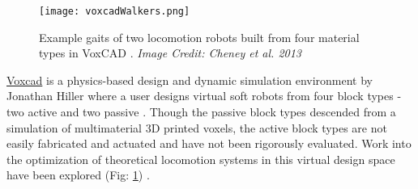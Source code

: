 {\begin{figure}
  \texttt{[image: voxcadWalkers.png]}
  \caption{Example gaits of two locomotion robots built from four material types in VoxCAD \cite{Cheney2013b}.  \textit{Image Credit: Cheney et al. 2013}}
  \label{fig:voxcadWalkers}
\end{figure}

\href{http://www.voxcad.com/}{Voxcad} is a physics-based design and dynamic simulation environment by Jonathan Hiller where a user designs virtual soft robots from four block types - two active and two passive \cite{Hiller2014a}.  Though the passive block types descended from a simulation of multimaterial 3D printed voxels, the active block types are not easily fabricated and actuated \cite{Hiller2012} and have not been rigorously evaluated.  Work into the optimization of theoretical locomotion systems in this virtual design space have been explored (Fig: \ref{fig:voxcadWalkers}) \cite{Cheney2013b} \cite{Cheney2013} \cite{Cheney2015}.

}